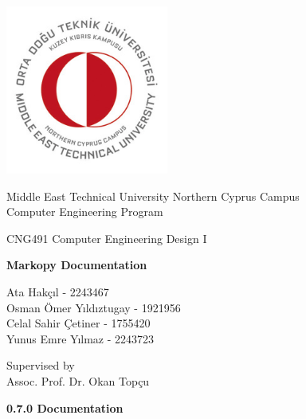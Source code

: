 \let\mypdfximage\pdfximage\def\pdfximage{\immediate\mypdfximage}\documentclass[twoside]{book}
\newcommand{\+}{\discretionary{\mbox{\scriptsize$\hookleftarrow$}}{}{}}
\begin{document}
\hypersetup{pageanchor=false,
             bookmarksnumbered=true,
             pdfencoding=unicode
            }
\begin{titlepage}
\begin{center}
    
    \includegraphics[width=0.4\textwidth]{university}
        
    \Large
    Middle East Technical University Northern Cyprus Campus\\
    Computer Engineering Program\\
    
    \vspace{2cm}
    
    CNG491 Computer Engineering Design I
    
    \vspace{2cm}
    
    \Large
    \textbf{Markopy Documentation}
    
    \vspace{2cm}
    
    \large   
    Ata Hakçıl - 2243467\\
    Osman Ömer Yıldıztugay - 1921956\\ 
    Celal Sahir Çetiner - 1755420\\
    Yunus Emre Yılmaz - 2243723\\

    
    \vspace{2cm}
    
    \large   
    Supervised by\\
    Assoc. Prof. Dr. Okan Topçu\\
    
    \vfill
        
    \large
    
    \textbf{0.7.0 Documentation}
    
\end{center}
\end{titlepage}
\tableofcontents
{}
\hypersetup{pageanchor=true}
\end{document}
